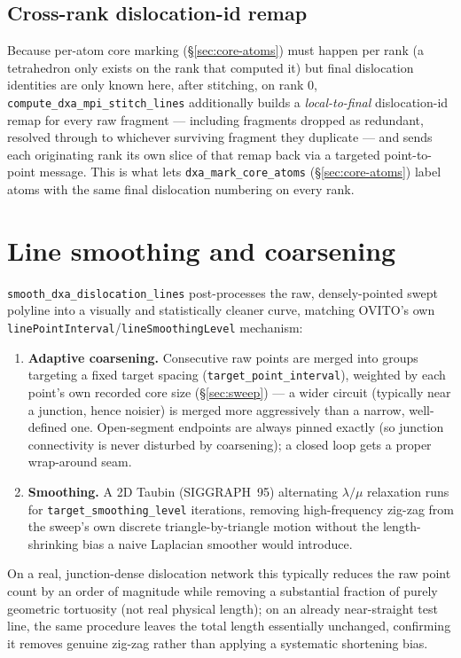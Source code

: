 \documentclass[11pt,a4paper]{article}
\newcommand{\op}[1]{\texttt{#1}}
\newcommand{\code}[1]{\texttt{#1}}
\begin{document}
\subsection{Cross-rank dislocation-id remap}

Because per-atom core marking (\S\ref{sec:core-atoms}) must happen per rank (a tetrahedron only
exists on the rank that computed it) but final dislocation identities are only known here, after
stitching, on rank 0, \op{compute\_dxa\_mpi\_stitch\_lines} additionally builds a
\emph{local-to-final} dislocation-id remap for every raw fragment — including fragments dropped as
redundant, resolved through to whichever surviving fragment they duplicate — and sends each
originating rank its own slice of that remap back via a targeted point-to-point message. This is
what lets \op{dxa\_mark\_core\_atoms} (\S\ref{sec:core-atoms}) label atoms with the same final
dislocation numbering on every rank.

\section{Line smoothing and coarsening}
\label{sec:smoothing}

\op{smooth\_dxa\_dislocation\_lines} post-processes the raw, densely-pointed swept polyline into a
visually and statistically cleaner curve, matching OVITO's own
\code{linePointInterval}/\code{lineSmoothingLevel} mechanism:
\begin{enumerate}[nosep]
  \item \textbf{Adaptive coarsening.} Consecutive raw points are merged into groups targeting a
    fixed target spacing (\code{target\_point\_interval}), weighted by each point's own recorded
    core size (\S\ref{sec:sweep}) — a wider circuit (typically near a junction, hence noisier)
    is merged more aggressively than a narrow, well-defined one. Open-segment endpoints are always
    pinned exactly (so junction connectivity is never disturbed by coarsening); a closed loop gets
    a proper wrap-around seam.
  \item \textbf{Smoothing.} A 2D Taubin (SIGGRAPH~95) alternating $\lambda/\mu$ relaxation runs for
    \code{target\_smoothing\_level} iterations, removing high-frequency zig-zag from the sweep's
    own discrete triangle-by-triangle motion without the length-shrinking bias a naive Laplacian
    smoother would introduce.
\end{enumerate}
On a real, junction-dense dislocation network this typically reduces the raw point count by an
order of magnitude while removing a substantial fraction of purely geometric tortuosity (not real
physical length); on an already near-straight test line, the same procedure leaves the total length
essentially unchanged, confirming it removes genuine zig-zag rather than applying a systematic
shortening bias.
\end{document}
